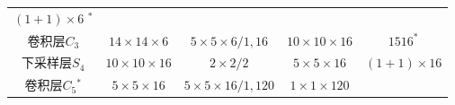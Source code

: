 \begin{longtable}[]{ ccccc }
\begin{minipage}[t]{0.24\columnwidth}
\((1+1)\times6\) \(^*\)\strut
\end{minipage}\tabularnewline
\begin{minipage}[t]{0.12\columnwidth}\centering\strut
卷积层\(C_3\)\strut
\end{minipage} & \begin{minipage}[t]{0.16\columnwidth}\centering\strut
\(14\times14\times6\)\strut
\end{minipage} & \begin{minipage}[t]{0.19\columnwidth}\centering\strut
\(5\times5\times6/1,16\)\strut
\end{minipage} & \begin{minipage}[t]{0.16\columnwidth}\centering\strut
\(10\times10\times16\)\strut
\end{minipage} & \begin{minipage}[t]{0.24\columnwidth}\centering\strut
\(1516^*\)\strut
\end{minipage}\tabularnewline
\begin{minipage}[t]{0.12\columnwidth}\centering\strut
下采样层\(S_4\)\strut
\end{minipage} & \begin{minipage}[t]{0.16\columnwidth}\centering\strut
\(10\times10\times16\)\strut
\end{minipage} & \begin{minipage}[t]{0.19\columnwidth}\centering\strut
\(2\times2/2\)\strut
\end{minipage} & \begin{minipage}[t]{0.16\columnwidth}\centering\strut
\(5\times5\times16\)\strut
\end{minipage} & \begin{minipage}[t]{0.24\columnwidth}\centering\strut
\((1+1)\times16\)\strut
\end{minipage}\tabularnewline
\begin{minipage}[t]{0.12\columnwidth}\centering\strut
卷积层\(C_5\)\(^*\)\strut
\end{minipage} & \begin{minipage}[t]{0.16\columnwidth}\centering\strut
\(5\times5\times16\)\strut
\end{minipage} & \begin{minipage}[t]{0.19\columnwidth}\centering\strut
\(5\times5\times16/1,120\)\strut
\end{minipage} & \begin{minipage}[t]{0.16\columnwidth}\centering\strut
\(1\times1\times120\)\strut
\end{minipage} & \begin{minipage}[t]{0.24\columnwidth}\centering\strut

\end{minipage}
\end{longtable}
